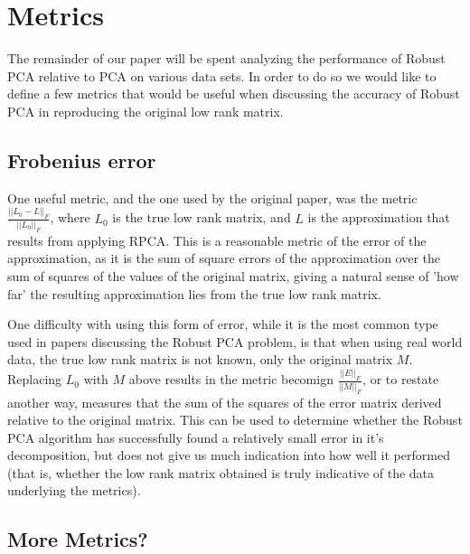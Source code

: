 \documentclass[11pt]{scrartcl} %
\theoremstyle{plain}
\begin{document}
\section{Metrics}
The remainder of our paper will be spent analyzing the performance of Robust PCA relative to PCA on various data sets. In order to do so we would like to define a few metrics that would be useful when discussing the accuracy of Robust PCA in reproducing the original low rank matrix.

\subsection{Frobenius error}
One useful metric, and the one used by the original paper, was the metric $\frac{||L_0 - L||_F}{||L_0||_F}$, where $L_0$ is the true low rank matrix, and $L$ is the approximation that results from applying RPCA. This is a reasonable metric of the error of the approximation, as it is the sum of square errors of the approximation over the sum of squares of the values of the original matrix, giving a natural sense of 'how far' the resulting approximation lies from the true low rank matrix.

One difficulty with using this form of error, while it is the most common type used in papers discussing the Robust PCA problem, is that when using real world data, the true low rank matrix is not known, only the original matrix $M$. Replacing $L_0$ with $M$ above results in the metric becomign $\frac{||E||_F}{||M||_F}$, or to restate another way, measures that the sum of the squares of the error matrix derived relative to the original matrix. This can be used to determine whether the Robust PCA algorithm has successfully found a relatively small error in it's decomposition, but does not give us much indication into how well it performed (that is, whether the low rank matrix obtained is truly indicative of the data underlying the metrics).

\subsection{More Metrics?}
\end{document}
